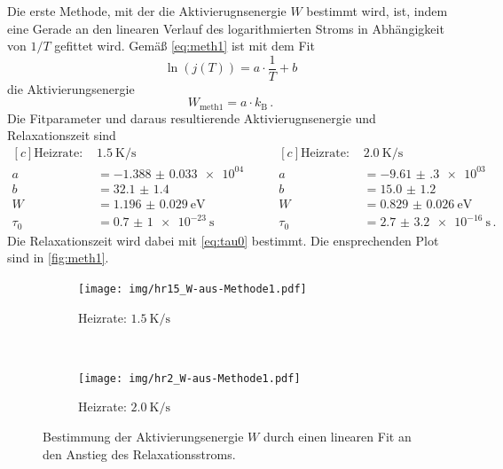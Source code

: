 Die erste Methode, mit der die Aktivierugnsenergie $W$ bestimmt wird, ist, indem eine Gerade an den linearen Verlauf des logarithmierten Stroms in Abhängigkeit von $1/T$ gefittet wird. Gemäß \autoref{eq:meth1} ist mit dem Fit
\begin{equation}
  \ln{(j(T))} = a \cdot \frac{1}{T} + b
\end{equation}
die Aktivierungsenergie
\begin{equation*}
  W_\text{meth1} = a \cdot k_\text{B}\,.
\end{equation*}
Die Fitparameter und daraus resultierende Aktivierugnsenergie und Relaxationszeit sind
\begin{equation*}
\begin{aligned}[c]
  \text{Heizrate: }& \SI{1.5}{\kelvin\per\second}\\
  a &= \num{-1.388(33)e+04}\\
  b &= \num{32.1(14)}\\
  W &= \SI{1.196(29)}{\electronvolt}\\
  \tau_0 &= \SI{0.7(10)e-23}{\second}
\end{aligned}
\qquad
\begin{aligned}[c]
  \text{Heizrate: }& \SI{2.0}{\kelvin\per\second}\\
  a &= \num{-9.61(30)e+03}\\
  b &= \num{15.0(12)}\\
  W &= \SI{0.829(26)}{\electronvolt}\\
  \tau_0 &= \SI{2.7(32)e-16}{\second}\,.
\end{aligned}
\end{equation*}
Die Relaxationszeit wird dabei mit \autoref{eq:tau0} bestimmt. Die ensprechenden Plot sind in \autoref{fig:meth1}.
\begin{figure}[htp]
    \centering
    \begin{subfigure}[t]{0.5\textwidth}
        \centering
        \texttt{[image: img/hr15\_W-aus-Methode1.pdf]}
        \caption{Heizrate: $\SI{1.5}{\kelvin\per\second}$}
    \end{subfigure}%
    ~
    \begin{subfigure}[t]{0.5\textwidth}
        \centering
        \texttt{[image: img/hr2\_W-aus-Methode1.pdf]}
        \caption{Heizrate: $\SI{2.0}{\kelvin\per\second}$}
    \end{subfigure}
    \caption{Bestimmung der Aktivierungsenergie $W$ durch einen linearen Fit an den Anstieg des Relaxationsstroms.}
    \label{fig:meth1}
\end{figure}

